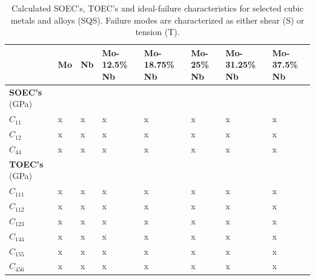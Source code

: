 \documentclass[showpacs,aps,floatfix,prb,reprint,superscriptaddress]{revtex4-1}
\begin{document}
\begin{table}
\caption{\label{tab:cubic_properties_total} Calculated SOEC's, TOEC's and ideal-failure characteristics for selected cubic metals and alloys (SQS). Failure modes are characterized as either shear (S) or tension (T).}
\begin{ruledtabular}
\begin{tabular}{l l l l l l l l}
 & Mo & Nb & Mo-12.5\% Nb & Mo-18.75\% Nb & Mo-25\% Nb & Mo-31.25\% Nb & Mo-37.5\% Nb  \\
\hline
\textbf{SOEC's} (GPa) & & & & & & & \\
$C_{11}$ & x & x & x & x & x & x & x \\
$C_{12}$ & x & x & x & x & x & x & x \\
$C_{44}$ & x & x & x & x & x & x & x \\
\hline
\textbf{TOEC's} (GPa) & & & & & & & \\
$C_{111}$ & x & x & x & x & x & x & x \\
$C_{112}$ & x & x & x & x & x & x & x \\
$C_{123}$ & x & x & x & x & x & x & x \\
$C_{144}$ & x & x & x & x & x & x & x \\
$C_{155}$ & x & x & x & x & x & x & x \\
$C_{456}$ & x & x & x & x & x & x & x \\
\hline
\end{tabular}
\end{ruledtabular}
\end{table}
\end{document}
